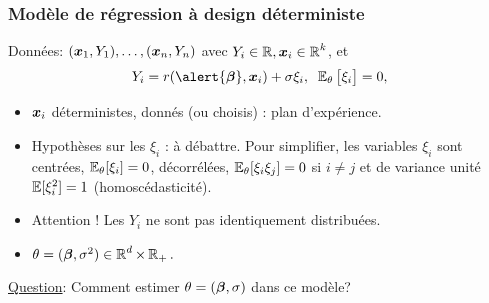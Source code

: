 
\begin{frame}
\frametitle{Modèle de régression à design déterministe}
\begin{df}
Données: $(\operatorname{\boldsymbol{x}}_1,Y_1),\ldots, (\operatorname{\boldsymbol{x}}_n,Y_n)$ avec $Y_i \in \operatorname{{\mathbb R}}, \operatorname{\boldsymbol{x}}_i\in \operatorname{{\mathbb R}}^k$, et 
$$Y_i =
r(\alert{\truebeta},\bx_i)+ \sigma \xi_i,\;\;\E_{\truetheta}\big[\xi_i\big]=0,
$$
\begin{itemize}
\item \alert<1>{$\operatorname{\boldsymbol{x}}_i$ déterministes, donnés (ou choisis) : plan d'expérience.}
\item \alert<2>{Hypothèses sur les $\xi_i$ : à débattre. \alert{Pour simplifier}, les variables $\xi_i$ sont centrées, $\operatorname{{\mathbb E}}_{\theta}[\xi_i]=0$,
décorrélées, $\operatorname{{\mathbb E}}_{\theta}[\xi_i \xi_j]= 0$ si $i \ne j$ et de variance unité $\operatorname{{\mathbb E}}[\xi_i^2]= 1$ \alert{ (homoscédasticité)}.}
\item \alert<3>{ Attention ! Les $Y_i$ ne sont pas identiquement distribuées.}
\item \alert<4>{$\theta= (\boldsymbol{\beta},\sigma^2) \in  \operatorname{{\mathbb R}}^d \times \operatorname{{\mathbb R}}_+.$}
\end{itemize}
\end{df}

\underline{Question}: Comment estimer $\theta=(\boldsymbol{\beta},\sigma)$ dans ce modèle?

\end{frame}

